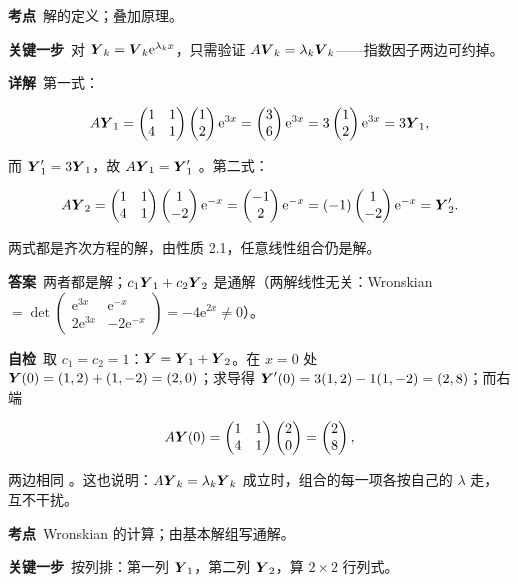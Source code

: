\documentclass[11pt]{ctexart}
\renewcommand{\qbreak}{\needspace{0.26\textheight}}
\newcommand{\qpagebreak}{\needspace{0.92\textheight}}
\newcommand{\mat}[1]{\begin{pmatrix}#1\end{pmatrix}}
\begin{document}
\textbf{考点}\ 解的定义；叠加原理。

\textbf{关键一步}\ 对 $\boldsymbol{Y}_k=\boldsymbol{V}_k\mathrm{e}^{\lambda_k x}$，只需验证 $A\boldsymbol{V}_k=\lambda_k\boldsymbol{V}_k$——指数因子两边可约掉。

\textbf{详解}\ 第一式：

\[
A\vect{Y}_1=\mat{1&1\\4&1}\mat{1\\2}\mathrm{e}^{3x}=\mat{3\\6}\mathrm{e}^{3x}=3\mat{1\\2}\mathrm{e}^{3x}=3\vect{Y}_1 ,
\]

而 $\boldsymbol{Y}_1'=3\boldsymbol{Y}_1$，故 $A\boldsymbol{Y}_1=\boldsymbol{Y}_1'$ 。第二式：

\[
A\vect{Y}_2=\mat{1&1\\4&1}\mat{1\\-2}\mathrm{e}^{-x}=\mat{-1\\2}\mathrm{e}^{-x}=(-1)\mat{1\\-2}\mathrm{e}^{-x}=\vect{Y}_2' .
\]

两式都是齐次方程的解，由性质 2.1，任意线性组合仍是解。

\textbf{答案}\ 两者都是解；$c_1\boldsymbol{Y}_1+c_2\boldsymbol{Y}_2$ 是通解（两解线性无关：Wronskian $=\det\mat{\mathrm{e}^{3x}&\mathrm{e}^{-x}\\2\mathrm{e}^{3x}&-2\mathrm{e}^{-x}}=-4\mathrm{e}^{2x}\neq0$）。

\textbf{自检}\ 取 $c_1=c_2=1$：$\boldsymbol{Y}=\boldsymbol{Y}_1+\boldsymbol{Y}_2$。在 $x=0$ 处 $\boldsymbol{Y}(0)=(1,2)+(1,-2)=(2,0)$；求导得 $\boldsymbol{Y}'(0)=3(1,2)-1(1,-2)=(2,8)$；而右端

\[
A\vect{Y}(0)=\mat{1&1\\4&1}\mat{2\\0}=\mat{2\\8},
\]

两边相同 。这也说明：$A\boldsymbol{Y}_k=\lambda_k\boldsymbol{Y}_k$ 成立时，组合的每一项各按自己的 $\lambda$ 走，互不干扰。

\qpagebreak
{}
\label{c1:app:a5}

\qbreak
{}

\textbf{考点}\ Wronskian 的计算；由基本解组写通解。

\textbf{关键一步}\ 按列排：第一列 $\boldsymbol{Y}_1$，第二列 $\boldsymbol{Y}_2$，算 $2\times2$ 行列式。
\end{document}
